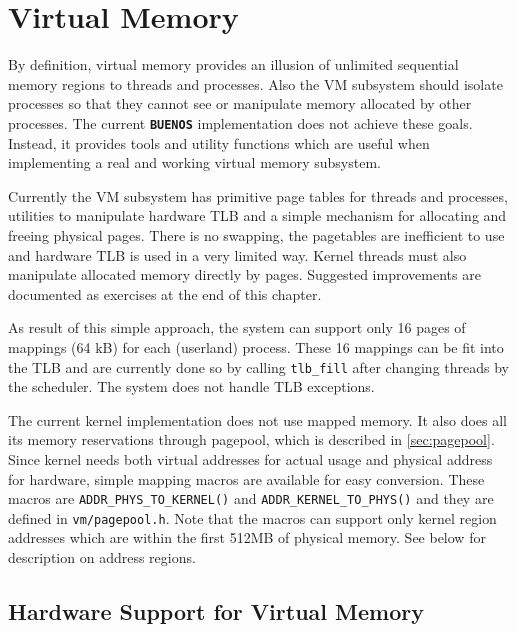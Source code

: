 \documentclass[twoside,a4paper]{report}
\newcommand{\buenos}{\texttt{\textbf{BUENOS}}}
\begin{document}
\chapter{Virtual Memory}
\label{sec:vm}


By definition, virtual memory provides an illusion of unlimited
sequential memory regions to threads and processes. Also the VM
subsystem should isolate processes so that they cannot see or
manipulate memory allocated by other processes. The current \buenos{}
implementation does not achieve these goals. Instead, it provides
tools and utility functions which are useful when implementing a real
and working virtual memory subsystem.

Currently the VM subsystem has primitive page tables for threads and
processes, utilities to manipulate hardware TLB and a simple mechanism
for allocating and freeing physical pages. There is no swapping, the
pagetables are inefficient to use and hardware TLB is used in a very
limited way. Kernel threads must also manipulate allocated memory
directly by pages. Suggested improvements are documented as exercises
at the end of this chapter.

As result of this simple approach, the system can support only 16
pages of mappings (64 kB) for each (userland) process. These 16
mappings can be fit into the TLB and are currently done so by calling
\texttt{tlb\_fill} after changing threads by the scheduler. The system
does not handle TLB exceptions. 

The current kernel implementation does not use mapped memory. It also
does all its memory reservations through pagepool, which is described
in \autoref{sec:pagepool}. Since kernel needs both virtual
addresses for actual usage and physical address for hardware, simple
mapping macros are available for easy conversion. These macros are
\texttt{ADDR\_PHYS\_TO\_KERNEL()}
 and
\texttt{ADDR\_KERNEL\_TO\_PHYS()}
 and
they are defined in \texttt{vm/pagepool.h}. Note that the macros can
support only kernel region addresses which are within the first 512MB
of physical memory. See below for description on address regions.

\section{Hardware Support for Virtual Memory}
\label{sec:segments}
\end{document}
